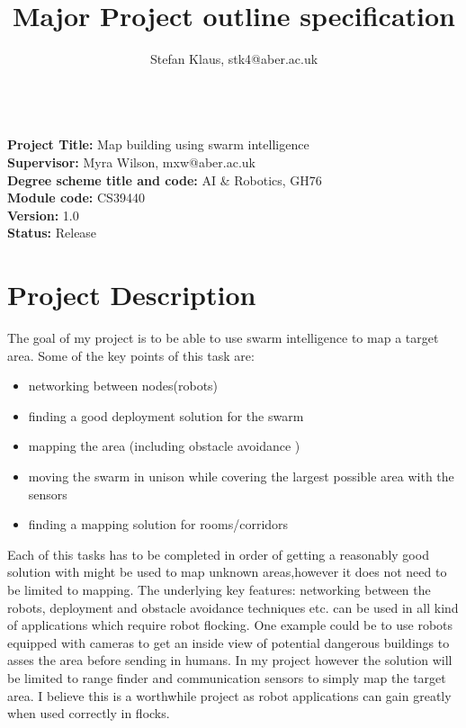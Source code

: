 \documentclass[10pt,a4paper]{article}
\author{Stefan Klaus, stk4@aber.ac.uk}
\title{Major Project outline specification }
\begin{document}

\maketitle
\begin{flushleft}
\hrulefill \\
\textbf{Project Title:} Map building using swarm intelligence \\[3ex]
\textbf{Supervisor:} Myra Wilson, mxw@aber.ac.uk\\[3ex]
\textbf{Degree scheme title and code:} AI \& Robotics, GH76\\[3ex]
\textbf{Module code:} CS39440\\[3ex]
\textbf{Version:} 1.0\\[3ex]
\textbf{Status:} Release\\
\hrulefill
\newpage

\section{Project Description }
The goal of my project is to be able to use swarm intelligence to map a target area. Some of the key points of this task are:

\begin{itemize}
\item networking between nodes(robots)
\item finding a good deployment solution for the swarm
\item mapping the area (including obstacle avoidance )
\item moving the swarm in unison while covering the largest possible area with the sensors
\item finding a mapping solution for rooms/corridors 
\end{itemize}

Each of this tasks has to be completed in order of getting a reasonably good solution with might be used to map unknown areas,however it does not need to be limited to mapping. The underlying key features: networking between the robots, deployment and obstacle avoidance techniques etc. can be used in all kind of applications which require robot flocking. One example could be to use robots equipped with cameras to get an inside view of potential dangerous buildings to asses the area before sending in humans. In my project however the solution will be limited to range finder and communication sensors to simply map the target area. I believe this is a worthwhile project as robot applications can gain greatly when used correctly in flocks.\\[3ex]


\end{flushleft}
\end{document}
